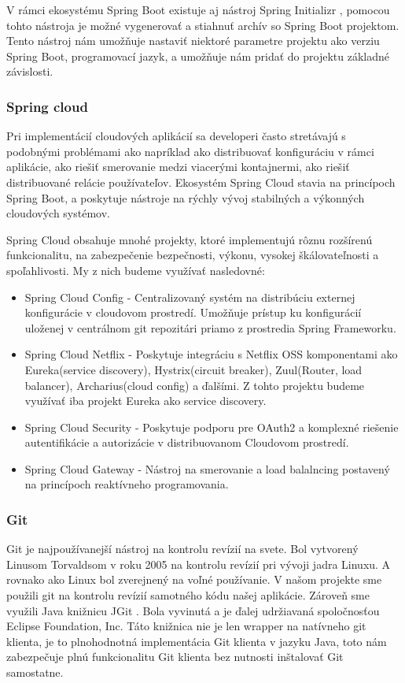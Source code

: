 V rámci ekosystému Spring Boot existuje aj nástroj Spring Initializr \cite{initializr}, pomocou tohto nástroja je možné vygenerovať a stiahnuť archív so Spring Boot projektom. Tento nástroj nám umožňuje nastaviť niektoré parametre projektu ako verziu Spring Boot, programovací jazyk, a umožňuje nám pridať do projektu základné závislosti.   

\subsubsection{Spring cloud}
Pri implementácií cloudových aplikácií sa developeri často stretávajú s podobnými problémami ako napríklad ako distribuovať konfiguráciu v rámci aplikácie, ako riešiť smerovanie medzi viacerými kontajnermi, ako riešiť distribuované relácie používateľov. Ekosystém Spring Cloud stavia na princípoch Spring Boot, a poskytuje nástroje na rýchly vývoj stabilných a výkonných cloudových systémov. 

Spring Cloud obsahuje mnohé projekty, ktoré implementujú rôznu rozšírenú funkcionalitu, na zabezpečenie bezpečnosti, výkonu, vysokej škálovateľnosti a spoľahlivosti.
My z nich budeme využívať nasledovné:
\begin{itemize}
\item Spring Cloud Config - Centralizovaný systém na distribúciu externej konfigurácie v cloudovom prostredí. Umožňuje prístup ku konfigurácií uloženej v centrálnom git repozitári priamo z prostredia Spring Frameworku.
\item Spring Cloud Netflix - Poskytuje integráciu s Netflix OSS komponentami ako Eureka(service discovery), Hystrix(circuit breaker), Zuul(Router, load balancer), Archarius(cloud config) a ďalšími. Z tohto projektu budeme využívať iba projekt Eureka ako service discovery.
\item Spring Cloud Security - Poskytuje podporu pre OAuth2 a komplexné riešenie autentifikácie a autorizácie v distribuovanom Cloudovom prostredí.
\item Spring Cloud Gateway - Nástroj na smerovanie a load balalncing postavený na princípoch reaktívneho programovania.
\end{itemize}




\subsubsection{Git}
Git je najpoužívanejší nástroj na kontrolu revízií na svete. Bol vytvorený Linusom Torvaldsom v roku 2005 na kontrolu revízií pri vývoji jadra Linuxu. A rovnako ako Linux bol zverejnený na voľné používanie. V našom projekte sme použili git na kontrolu revízií samotného kódu našej aplikácie. Zároveň sme využili Java knižnicu JGit \cite{jgit}. Bola vyvinutá a je ďalej udržiavaná spoločnosťou Eclipse Foundation, Inc. Táto knižnica nie je len wrapper na natívneho git klienta, je to plnohodnotná implementácia Git klienta v jazyku Java, toto nám zabezpečuje plnú funkcionalitu Git klienta bez nutnosti inštalovať Git samostatne. 

